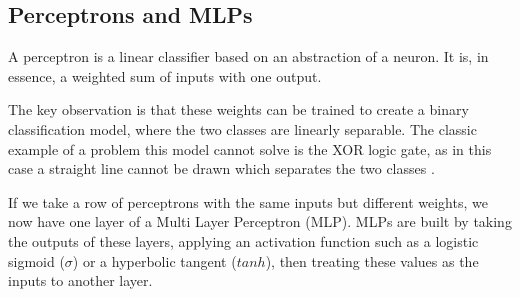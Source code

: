 \documentclass[bsc,singlespacing,logo, parskip, deptreport]{infthesis}
\begin{document}
\subsection{Perceptrons and MLPs}

A perceptron is a linear classifier based on an abstraction of a neuron. It is, in essence, a weighted sum of inputs with one output.

\begin{center}
\end{center}

The key observation is that these weights can be trained to create a binary classification model, where the two classes are linearly separable. The classic example of a problem this model cannot solve is the XOR logic gate, as in this case a straight line cannot be drawn which separates the two classes \cite{minsky1969perceptrons}.

If we take a row of perceptrons with the same inputs but different weights, we now have one layer of a Multi Layer Perceptron (MLP). MLPs are built by taking the outputs of these layers, applying an activation function such as a logistic sigmoid ($\sigma$) or a hyperbolic tangent ($tanh$), then treating these values as the inputs to another layer.

\begin{center}
\end{center}
\end{document}

